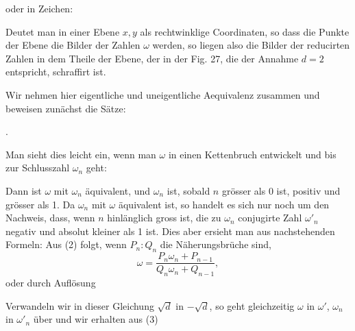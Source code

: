 


oder in Zeichen:


Deutet man in einer Ebene $x, y$ als rechtwinklige Coordinaten, so
dass die Punkte der Ebene die Bilder der Zahlen $\omega$ werden, so liegen
also die Bilder der reducirten Zahlen in dem Theile der Ebene, der in
der Fig. 27, die der Annahme $d = 2$ entspricht, schraffirt ist.


Wir nehmen hier eigentliche und uneigentliche Aequivalenz zusammen
und beweisen zunächst die Sätze:

.\quad {}

Man sieht dies leicht ein, wenn man $\omega$ in einen Kettenbruch entwickelt
und bis zur Schlusszahl $\omega_n$ geht:


Dann ist $\omega$ mit $\omega_n$ äquivalent, und $\omega_n$ ist, sobald $n$ grösser als 0
ist, positiv und grösser als 1. Da $\omega_n$ mit $\omega$ äquivalent ist, so handelt
es sich nur noch um den Nachweis, dass, wenn $n$ hinlänglich gross ist,
die zu $\omega_n$ conjugirte Zahl $\omega'_n$ negativ und absolut kleiner als 1 ist.
Dies aber ersieht man aus nachstehenden Formeln: Aus (2) folgt, wenn
$P_n : Q_n$ die Näherungsbrüche sind,
\[
\omega = \dfrac{P_n \omega_n + P_{n-1}}{Q_n \omega_n + Q_{n-1}},
\]
oder durch Auflösung


Verwandeln wir in dieser Gleichung $\sqrt{d}$ in $-\sqrt{d}$, so geht gleichzeitig
$\omega$ in $\omega'$, $\omega_n$ in $\omega'_n$ über und wir erhalten aus (3)

